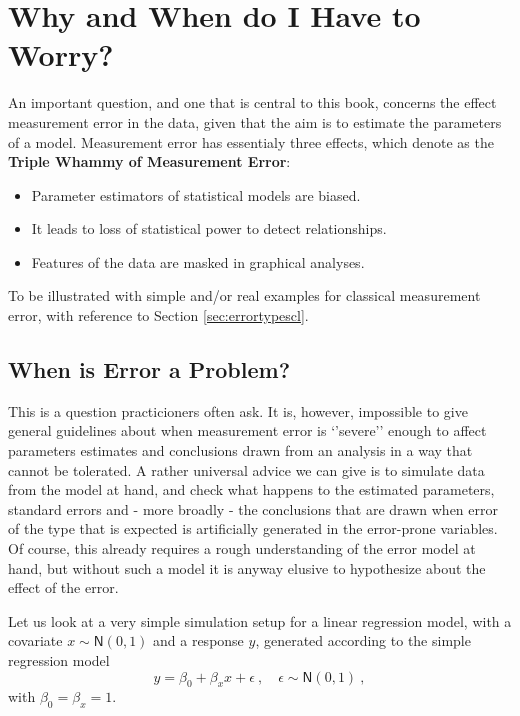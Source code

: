 \documentclass[]{book}
\providecommand{\tightlist}{%
  \setlength{\itemsep}{0pt}\setlength{\parskip}{0pt}}
\theoremstyle{definition}
\theoremstyle{definition}
\theoremstyle{definition}
\theoremstyle{remark}
\begin{document}
\section{Why and When do I Have to
Worry?}\label{why-and-when-do-i-have-to-worry}

An important question, and one that is central to this book, concerns
the effect measurement error in the data, given that the aim is to
estimate the parameters of a model. Measurement error has essentialy
three effects, which \citet{carroll.etal2006} denote as the
\textbf{Triple Whammy of Measurement Error}:

\begin{itemize}
\tightlist
\item
  Parameter estimators of statistical models are biased.
\item
  It leads to loss of statistical power to detect relationships.
\item
  Features of the data are masked in graphical analyses.
\end{itemize}

To be illustrated with simple and/or real examples for classical
measurement error, with reference to Section \ref{sec:errortypescl}.

\subsection{When is Error a Problem?}\label{when-is-error-a-problem}

This is a question practicioners often ask. It is, however, impossible
to give general guidelines about when measurement error is `'severe''
enough to affect parameters estimates and conclusions drawn from an
analysis in a way that cannot be tolerated. A rather universal advice we
can give is to simulate data from the model at hand, and check what
happens to the estimated parameters, standard errors and - more broadly
- the conclusions that are drawn when error of the type that is expected
is artificially generated in the error-prone variables. Of course, this
already requires a rough understanding of the error model at hand, but
without such a model it is anyway elusive to hypothesize about the
effect of the error.

Let us look at a very simple simulation setup for a linear regression
model, with a covariate \(x\sim\mathsf{N}(0,1)\) and a response \(y\),
generated according to the simple regression model
\[y = \beta_0 + \beta_x x + \epsilon \ , \quad \epsilon \sim \mathsf{N}(0,1) \ ,\]
with \(\beta_0=\beta_x=1\).
\end{document}
